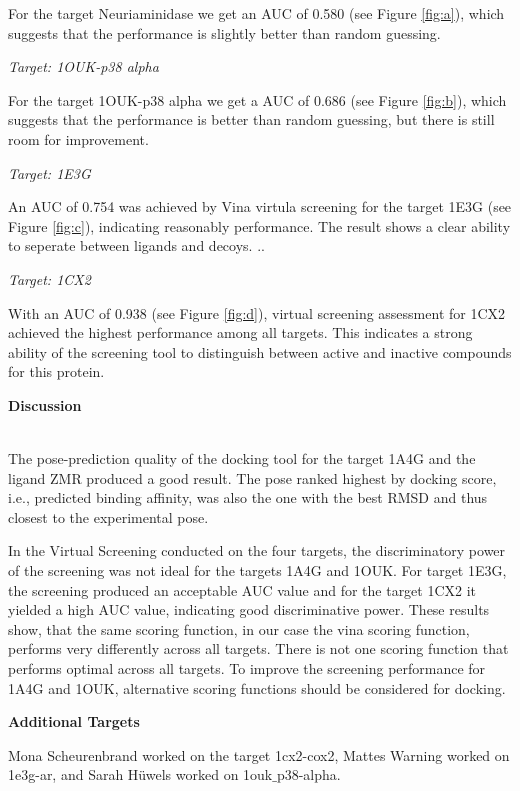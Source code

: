 \documentclass[a4paper,10pt]{article}
\begin{document}
For the target Neuriaminidase we get an AUC of 0.580 (see Figure \ref{fig:a}), which suggests that the performance is slightly better than random guessing. 



\textit{Target: 1OUK-p38 alpha}


For the target 1OUK-p38 alpha we get a AUC of 0.686 (see Figure \ref{fig:b}), which suggests that the performance is better than random guessing, but there is still room for improvement.

\textit{Target: 1E3G}

An AUC of 0.754 was achieved by Vina virtula screening for the target 1E3G (see Figure \ref{fig:c}), indicating reasonably performance. The result shows a clear ability to seperate between ligands and decoys.
..

\textit{Target: 1CX2}

With an AUC of 0.938 (see Figure \ref{fig:d}), virtual screening assessment for 1CX2 achieved the highest performance among all targets. This indicates a strong ability of the screening tool to distinguish between active and inactive compounds for this protein.




\begin{large}
	\vspace{0.5cm}
	\textbf{Discussion}
\end{large}	\\ [1mm]

The pose-prediction quality of the docking tool for the target 1A4G and the ligand ZMR produced a good result. The pose ranked highest by docking score, i.e., predicted binding affinity, was also  the one with the best RMSD and thus closest to the experimental pose. 

In the Virtual Screening conducted on the four targets, the discriminatory power of the screening was not ideal for the targets 1A4G and 1OUK. For target 1E3G, the screening produced an acceptable AUC value and for the target 1CX2 it yielded a high AUC value, indicating good discriminative power. These results show, that the same scoring function, in our case the vina scoring function, performs very differently across all targets. There is not one scoring function that performs optimal across all targets. To improve the screening performance for 1A4G and 1OUK, alternative scoring functions should be considered for docking.




\textbf{Additional Targets}

Mona Scheurenbrand worked on the target 1cx2-cox2, Mattes Warning worked on 1e3g-ar, and Sarah Hüwels worked on 1ouk$\_$p38-alpha.



\end{document}
